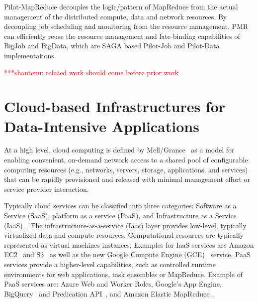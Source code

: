 \documentclass[times]{cpeauth}
\newcommand{\jhanote}[1]{ {\textcolor{red} { ***shantenu: #1 }}}
\newcommand{\jhanote}[1]{}
\begin{document}
\begin{itemize}
Pilot-MapReduce decouples the logic/pattern of MapReduce from the actual
management of the distributed compute, data and network resources. By
decoupling job scheduling and monitoring from the resource management, PMR can
efficiently reuse the resource management and late-binding capabilities of
BigJob and BigData, which are SAGA based Pilot-Job and Pilot-Data
implementations.

\end{itemize}

\jhanote{related work should come before prior work}

\section{Cloud-based Infrastructures for Data-Intensive Applications}

At a high level, cloud computing is defined by Mell/Grance~\cite{nist_cloud}
as a model for enabling convenient, on-demand network access to a shared pool
of configurable computing resources (e.g., networks, servers, storage,
applications, and services) that can be rapidly provisioned and released with
minimal management effort or service provider interaction.


Typically cloud services can be classified into three categories: Software as
a Service (SaaS), platform as a service (PaaS), and Infrastructure as a
Service (IaaS)~\cite{Jha:2010kx}. The infrastructure-as-a-service (Iaas) layer
provides low-level, typically virtualized data and compute resources.
Computational resources are typically represented as virtual machines
instances. Examples for IaaS services are Amazon EC2~\cite{amazon_ec2} and
S3~\cite{amazons3} as well as the new Google Compute Engine (GCE)~\cite{gce}
service. PaaS services provide a higher-level capabilities, such as controlled
runtime environments for web applications, task ensembles or MapReduce.
Example of PaaS services are: Azure Web and Worker Roles, Google's App Engine,
BigQuery~\cite{google-bigquery} and Predication
API~\cite{google-predication-api}, and Amazon Elastic
MapReduce~\cite{amazonemr}.


% 
\end{document}
